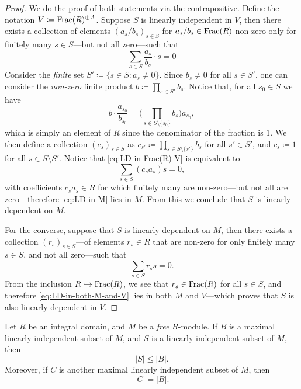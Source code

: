 \begin{proof}
We do the proof of both statements via the contrapositive. Define the notation
\(V \coloneq \operatorname{Frac}(R)^{\oplus A}\). Suppose \(S\) is linearly independent in
\(V\), then there exists a collection of elements \((a_s/b_s)_{s \in S}\) for
\(a_s/b_s \in \operatorname{Frac}(R)\) non-zero only for finitely many \(s \in S\)---but not
all zero---such that
\begin{equation}\label{eq:LD-in-Frac(R)-V}
\sum_{s \in S} \frac{a_s}{b_s} \cdot s = 0
\end{equation}
Consider the \emph{finite} set \(S' \coloneq \{s \in S \colon a_s \neq
0\}\). Since \(b_s \neq 0\) for all \(s \in S'\), one can consider the
\emph{non-zero} finite product \(b \coloneq \prod_{s \in S'} b_s\). Notice that,
for all \(s_0 \in S\) we have
\[
b \cdot \frac{a_{s_0}}{b_{s_0}}
= \bigg(\prod_{s \in S \setminus \{s_0\}} b_s \bigg) a_{s_0},
\]
which is simply an element of \(R\) since the denominator of the fraction is
\(1\). We then define a collection \((c_s)_{s \in S}\) as
\(c_{s'} \coloneq \prod_{s \in S \setminus \{s'\}} b_s\) for all \(s' \in S'\),
and \(c_s \coloneq 1\) for all \(s \in S \setminus S'\). Notice that
\cref{eq:LD-in-Frac(R)-V} is equivalent to
\begin{equation}\label{eq:LD-in-M}
\sum_{s \in S} (c_s a_s) s = 0,
\end{equation}
with coefficients \(c_s a_s \in R\) for which finitely many are non-zero---but
not all are zero---therefore \cref{eq:LD-in-M} lies in \(M\). From this we
conclude that \(S\) is linearly dependent on \(M\).

For the converse, suppose that \(S\) is linearly dependent on \(M\), then there
exists a collection \((r_s)_{s \in S}\)---of elements \(r_s \in R\) that are
non-zero for only finitely many \(s \in S\), and not all zero---such that
\begin{equation}\label{eq:LD-in-both-M-and-V}
\sum_{s \in S} r_s s = 0.
\end{equation}
From the inclusion \(R \hookrightarrow \operatorname{Frac}(R)\), we see that \(r_s \in \operatorname{Frac}(R)\) for all
\(s \in S\), and therefore \cref{eq:LD-in-both-M-and-V} lies in both \(M\) and
\(V\)---which proves that \(S\) is also linearly dependent in \(V\).
\end{proof}

\begin{proposition}
\label{prop:LI-leq-maximal-LI}
Let \(R\) be an integral domain, and \(M\) be a \emph{free} \(R\)-module. If
\(B\) is a maximal linearly independent subset of \(M\), and \(S\) is a linearly
independent subset of \(M\), then
\[
|S| \leq |B|.
\]
Moreover, if \(C\) is another maximal linearly independent subset of \(M\),
then
\[
|C| = |B|.
\]
\end{proposition}

